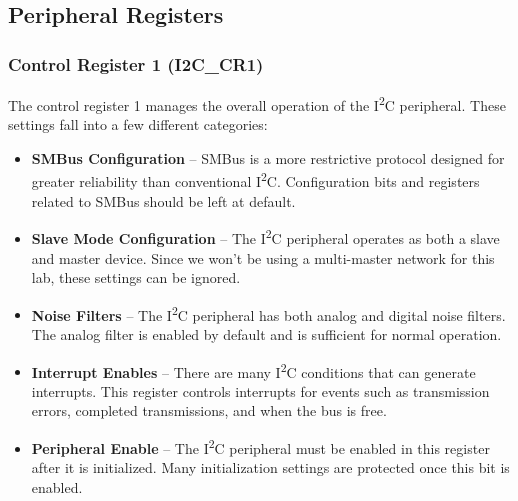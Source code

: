 \documentclass[openany,11pt,fleqn]{book} %
\begin{document}
\subsection{Peripheral Registers}
    \subsubsection{Control Register 1 (I2C\_CR1)}
    The control register 1 manages the overall operation of the I\textsuperscript{2}C peripheral. These settings fall into a few different categories:
    \begin{itemize}
        \item \textbf{SMBus Configuration} -- SMBus is a more restrictive protocol designed for greater reliability than conventional I\textsuperscript{2}C. Configuration bits and registers related to SMBus should be left at default. 
        \item \textbf{Slave Mode Configuration} -- The I\textsuperscript{2}C peripheral operates as both a slave and master device. Since we won't be using a multi-master network for this lab, these settings can be ignored. 
        \item \textbf{Noise Filters} -- The I\textsuperscript{2}C peripheral has both analog and digital noise filters. The analog filter is enabled by default and is sufficient for normal operation. 
        \item \textbf{Interrupt Enables} -- There are many I\textsuperscript{2}C conditions that can generate interrupts. This register controls interrupts for events such as transmission errors, completed transmissions, and when the bus is free. 
        \item \textbf{Peripheral Enable} -- The I\textsuperscript{2}C peripheral must be enabled in this register after it is initialized. Many initialization settings are protected once this bit is enabled.
    \end{itemize}  
    
\end{document}
